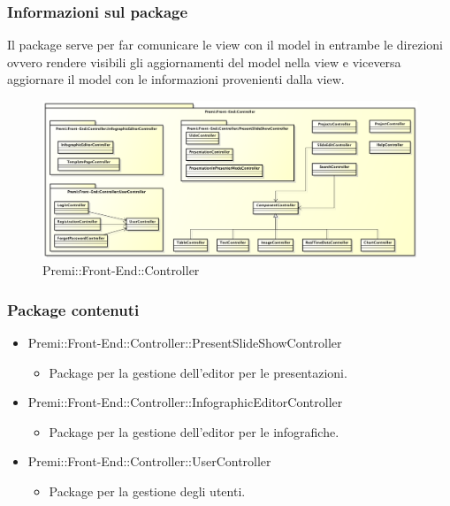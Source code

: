 \subsubsection*{Informazioni sul package}
	Il package serve per far comunicare le view con il model in entrambe le direzioni ovvero rendere visibili gli aggiornamenti del model nella view e viceversa aggiornare il model con le informazioni provenienti dalla view.
		\begin{figure}[h]
			\centering
			\includegraphics[width=1.0\linewidth]{img/front-end_controller}
			\caption[Premi::Front-End::Controller]{Premi::Front-End::Controller}
		\end{figure}
	\subsubsection*{Package contenuti}
		\begin{itemize}
		 \item Premi::Front-End::Controller::PresentSlideShowController
		 \begin{itemize}
		    \item Package per la gestione dell'editor per le presentazioni.
		 \end{itemize}
		 \item Premi::Front-End::Controller::InfographicEditorController
		 \begin{itemize}
		    \item Package per la gestione dell'editor per le infografiche.
		 \end{itemize}
		 \item Premi::Front-End::Controller::UserController
		 \begin{itemize}
		    \item Package per la gestione degli utenti.
		 \end{itemize}
		\end{itemize}
